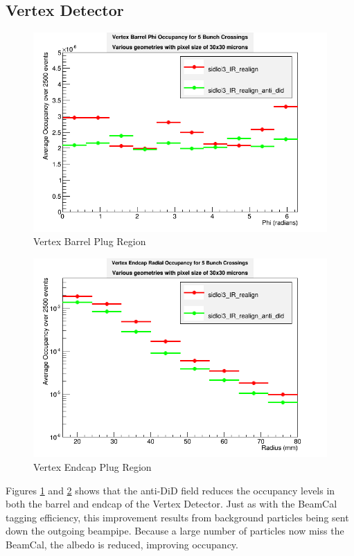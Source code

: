\documentclass{report}
\begin{document}
            \subsection{Vertex Detector}
                \begin{figure}[H] 
                    \includegraphics[width=\textwidth]{VradOccupancy_base_brl}
                    \centering
                    \caption{Vertex Barrel Plug Region}
                    \label{did_vertex_brl}
                \end{figure}
                \begin{figure}[H] 
                    \includegraphics[width=\textwidth]{VradOccupancy_base_ecp}
                    \centering
                    \caption{Vertex Endcap Plug Region}
                    \label{did_vertex_ecp}
                \end{figure}
                Figures \ref{did_vertex_brl} and \ref{did_vertex_ecp} shows that the anti-DiD field reduces the occupancy levels in both the barrel and endcap of the Vertex Detector. Just as with the BeamCal tagging efficiency, this improvement results from background particles being sent down the outgoing beampipe. Because a large number of particles now miss the BeamCal, the albedo is reduced, improving occupancy.
\end{document}
